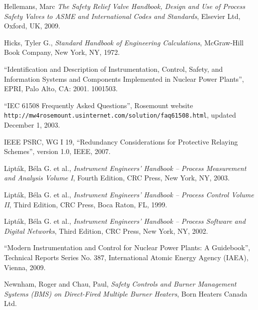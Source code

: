 \vskip 10pt

\noindent
Hellemans, Marc \textit{The Safety Relief Valve Handbook, Design and Use of Process Safety Valves to ASME and International Codes and Standards}, Elsevier Ltd, Oxford, UK, 2009.

\vskip 10pt

\noindent
Hicks, Tyler G., \textit{Standard Handbook of Engineering Calculations}, McGraw-Hill Book Company, New York, NY, 1972.

\vskip 10pt

\noindent
``Identification and Description of Instrumentation, Control, Safety, and Information Systems and Components Implemented in Nuclear Power Plants'', EPRI, Palo Alto, CA: 2001.  1001503.

\vskip 10pt

\noindent
``IEC 61508 Frequently Asked Questions'', Rosemount website \texttt{http://mw4rosemount.usinternet.com/solution/faq61508.html}, updated December 1, 2003.

\vskip 10pt

\vskip 10pt

\noindent
IEEE PSRC, WG I 19, ``Redundancy Considerations for Protective Relaying Schemes'', version 1.0, IEEE, 2007.

\noindent
Lipt\'ak, B\'ela G. et al., \textit{Instrument Engineers' Handbook -- Process Measurement and Analysis Volume I}, Fourth Edition, CRC Press, New York, NY, 2003.

\vskip 10pt

\noindent
Lipt\'ak, B\'ela G. et al., \textit{Instrument Engineers' Handbook -- Process Control Volume II}, Third Edition, CRC Press, Boca Raton, FL, 1999.

\vskip 10pt

\noindent
Lipt\'ak, B\'ela G. et al., \textit{Instrument Engineers' Handbook -- Process Software and Digital Networks}, Third Edition, CRC Press, New York, NY, 2002.

\vskip 10pt

\noindent
``Modern Instrumentation and Control for Nuclear Power Plants: A Guidebook'', Technical Reports Series No. 387, International Atomic Energy Agency (IAEA), Vienna, 2009.

\vskip 10pt

\noindent
Newnham, Roger and Chau, Paul, \textit{Safety Controls and Burner Management Systems (BMS) on Direct-Fired Multiple Burner Heaters}, Born Heaters Canada Ltd.

\vskip 10pt

